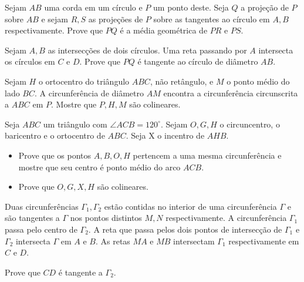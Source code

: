 \begin{questao}
  Sejam $AB$ uma corda em um círculo e $P$ um ponto deste. Seja
  $Q$ a projeção de $P$ sobre $AB$ e sejam $R,S$ as projeções
  de $P$ sobre as tangentes ao círculo em $A,B$
  respectivamente. Prove que $PQ$ é a média geométrica de $PR$ e
  $PS$.
\end{questao}

\begin{questao}
  Sejam $A,B$ as intersecções de dois círculos. Uma reta passando
  por $A$ intersecta os círculos em $C$ e $D$. Prove que $PQ$
  é tangente ao círculo de diâmetro $AB$.
\end{questao}

\begin{questao}
  Sejam $H$ o ortocentro do triângulo $ABC$, não retângulo, e
  $M$ o ponto médio do lado $BC$. A circunferência de diâmetro
  $AM$ encontra a circunferência circunscrita a $ABC$ em
  $P$. Mostre que $P,H,M$ são colineares.
\end{questao}

\begin{questao}
  Seja $ABC$ um triângulo com $\angle ACB = 120^\circ$. Sejam $O,G,H$
  o circuncentro, o baricentro e o ortocentro de $ABC$. Seja X o
  incentro de $AHB$.
  \begin{itemize}
    \item Prove que os pontos $A,B,O,H$ pertencem a uma mesma circunferência e
    mostre que seu centro é ponto médio do arco $ACB$.

    \item Prove que $O,G,X,H$ são colineares.
  \end{itemize}
\end{questao}

\begin{questao}
  Duas circunferências $\Gamma_1,\Gamma_2$ estão contidas no
  interior de uma circunferência $\Gamma$ e são tangentes a
  $\Gamma$ nos pontos distintos $M,N$ respectivamente. A
  circunferência $\Gamma_1$ passa pelo centro de $\Gamma_2$. A
  reta que passa pelos dois pontos de intersecção de $\Gamma_1$ e
  $\Gamma_2$ intersecta $\Gamma$ em $A$ e $B$. As retas $MA$
  e $MB$ intersectam $\Gamma_1$ respectivamente em $C$ e $D$.

  Prove que $CD$ é tangente a $\Gamma_2$.
\end{questao}

